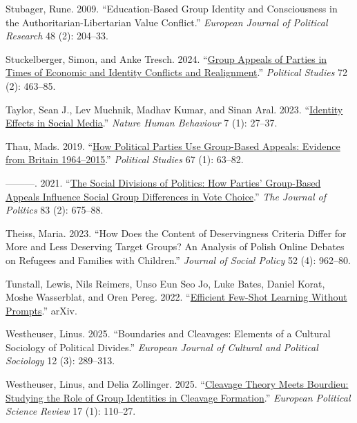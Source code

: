 \documentclass[12pt]{article}
\begin{document}
\begin{CSLReferences}{1}{0}
Stubager, Rune. 2009. {``Education-Based Group Identity and Consciousness in the Authoritarian-Libertarian Value Conflict.''} \emph{European Journal of Political Research} 48 (2): 204--33.

Stuckelberger, Simon, and Anke Tresch. 2024. {``\href{https://doi.org/10.1177/00323217221123147}{Group Appeals of Parties in Times of Economic and Identity Conflicts and Realignment}.''} \emph{Political Studies} 72 (2): 463--85.

Taylor, Sean J., Lev Muchnik, Madhav Kumar, and Sinan Aral. 2023. {``\href{https://doi.org/10.1038/s41562-022-01459-8}{Identity Effects in Social Media}.''} \emph{Nature Human Behaviour} 7 (1): 27--37.

Thau, Mads. 2019. {``\href{https://doi.org/10.1177/0032321717744495}{How Political Parties Use Group-Based Appeals: Evidence from Britain 1964--2015}.''} \emph{Political Studies} 67 (1): 63--82.

---------. 2021. {``\href{https://doi.org/10.1086/710018}{The Social Divisions of Politics: How Parties' Group-Based Appeals Influence Social Group Differences in Vote Choice}.''} \emph{The Journal of Politics} 83 (2): 675--88.

Theiss, Maria. 2023. {``How Does the Content of Deservingness Criteria Differ for More and Less Deserving Target Groups? An Analysis of Polish Online Debates on Refugees and Families with Children.''} \emph{Journal of Social Policy} 52 (4): 962--80.

Tunstall, Lewis, Nils Reimers, Unso Eun Seo Jo, Luke Bates, Daniel Korat, Moshe Wasserblat, and Oren Pereg. 2022. {``\href{https://doi.org/10.48550/arXiv.2209.11055}{Efficient Few-Shot Learning Without Prompts}.''} {arXiv}.

Westheuser, Linus. 2025. {``Boundaries and Cleavages: Elements of a Cultural Sociology of Political Divides.''} \emph{European Journal of Cultural and Political Sociology} 12 (3): 289--313.

Westheuser, Linus, and Delia Zollinger. 2025. {``\href{https://doi.org/10.1017/S1755773924000249}{Cleavage Theory Meets Bourdieu: Studying the Role of Group Identities in Cleavage Formation}.''} \emph{European Political Science Review} 17 (1): 110--27.


\end{CSLReferences}
\end{document}
